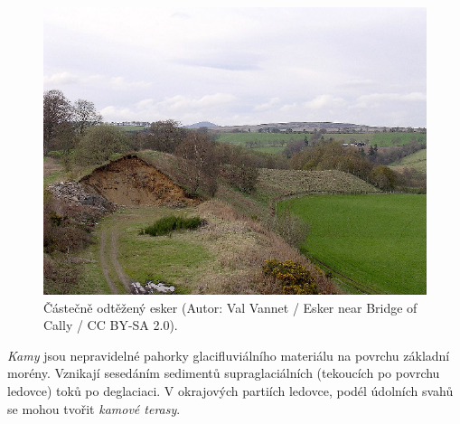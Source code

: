 \begin{figure}
	\centering
	\includegraphics[width=1\linewidth]{obrazky/glac/esker}
	\caption{Částečně odtěžený esker (Autor: Val Vannet / Esker near Bridge of Cally / CC BY-SA 2.0).}
	\label{fig:esker}
\end{figure}

\emph{Kamy} jsou nepravidelné pahorky glacifluviálního materiálu na povrchu základní morény. Vznikají sesedáním sedimentů supraglaciálních (tekoucích po povrchu ledovce) toků po deglaciaci. V okrajových partiích ledovce, podél údolních svahů se mohou tvořit \emph{kamové terasy}.

